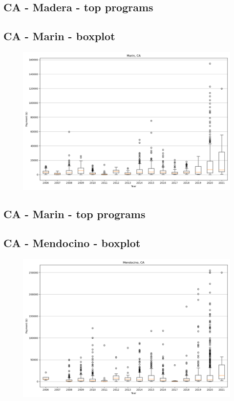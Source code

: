 \subsection*{CA - Madera - top programs}

\newpage
\subsection*{CA - Marin - boxplot}
\begin{figure}[h]
\centering
\includegraphics[width=7in]{../output/boxplots/counties/Marin-CA_boxplot.png}
\end{figure}


\subsection*{CA - Marin - top programs}

\newpage
\subsection*{CA - Mendocino - boxplot}
\begin{figure}[h]
\centering
\includegraphics[width=7in]{../output/boxplots/counties/Mendocino-CA_boxplot.png}
\end{figure}


